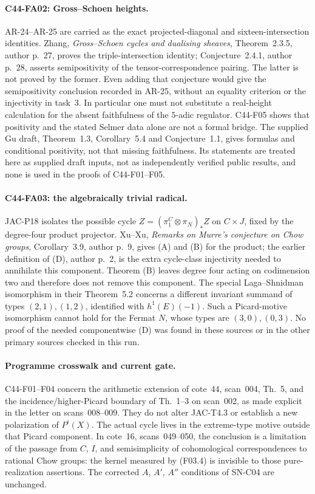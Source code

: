 \documentclass[11pt]{article}
\theoremstyle{remark}\newtheorem{remark}[theorem]{Remark}
\begin{document}
\paragraph{C44-FA02: Gross--Schoen heights.}
AR-24--AR-25 are carried as the exact projected-diagonal and
sixteen-intersection identities.  Zhang,
\emph{Gross--Schoen cycles and dualising sheaves},
Theorem~2.3.5, author p.~27, proves the triple-intersection
identity; Conjecture~2.4.1, author p.~28, asserts semipositivity
of the tensor-correspondence pairing.  The latter is not proved
by the former.  Even adding that conjecture would give the
semipositivity conclusion recorded in AR-25, without an
equality criterion or the injectivity in task~3.  In particular
one must not substitute a real-height calculation for
the absent faithfulness of the $5$-adic regulator.  C44-F05
shows that positivity and the stated Selmer data alone are not
a formal bridge.  The supplied Gu draft, Theorem~1.3,
Corollary~5.4 and Conjecture~1.1, gives formulas and
conditional positivity, not that missing faithfulness.  Its
statements are treated here as supplied draft inputs, not as
independently verified public results, and none is used in the
proofs of C44-F01--F05.

\paragraph{C44-FA03: the algebraically trivial radical.}
JAC-P18 isolates the possible cycle
$Z=(\pi_1^C\otimes\pi_N)_*Z$ on $C\times J$, fixed by the
degree-four product projector.  Xu--Xu,
\emph{Remarks on Murre's conjecture on Chow groups},
Corollary~3.9, author p.~9, gives (A) and (B) for the product;
the earlier definition of (D), author p.~2, is the extra
cycle-class injectivity needed to annihilate this component.
Theorem (B) leaves degree four acting on codimension two and
therefore does not remove this component.  The special
Laga--Shnidman isomorphism in their Theorem~5.2 concerns a
different invariant summand of types $(2,1),(1,2)$, identified
with $h^1(E)(-1)$.  Such a Picard-motive isomorphism cannot hold
for the Fermat $N$, whose types are $(3,0),(0,3)$.
No proof of the needed componentwise (D) was found in these
sources or in the other primary sources checked in this run.

\paragraph{Programme crosswalk and current gate.}
C44-F01--F04 concern the arithmetic extension of cote~44,
scan~004, Th.~5, and the incidence/higher-Picard boundary of
Th.~1--3 on scan~002, as made explicit in the letter on
scans~008--009.  They do not alter JAC-T4.3 or establish a new
polarization of $P^i(X)$.  The actual cycle lives in the
extreme-type motive outside that Picard component.
In cote~16, scans~049--050, the conclusion is a limitation of
the passage from $C$, $I$, and semisimplicity of cohomological
correspondences to rational Chow groups: the kernel measured
by (F03.4) is invisible to those pure-realization assertions.
The corrected $A$, $A'$, $A''$ conditions of SN-C04 are
unchanged.
\end{document}
